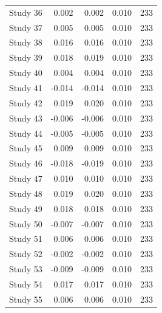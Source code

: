 \begin{table}[!h]
{\begin{tabular}[t]{rrrrr}
\hspace{1em}Study 36 & 0.002 & 0.002 & 0.010 & 233\\
\hspace{1em}Study 37 & 0.005 & 0.005 & 0.010 & 233\\
\hspace{1em}Study 38 & 0.016 & 0.016 & 0.010 & 233\\
\hspace{1em}Study 39 & 0.018 & 0.019 & 0.010 & 233\\
\hspace{1em}Study 40 & 0.004 & 0.004 & 0.010 & 233\\
\hspace{1em}Study 41 & -0.014 & -0.014 & 0.010 & 233\\
\hspace{1em}Study 42 & 0.019 & 0.020 & 0.010 & 233\\
\hspace{1em}Study 43 & -0.006 & -0.006 & 0.010 & 233\\
\hspace{1em}Study 44 & -0.005 & -0.005 & 0.010 & 233\\
\hspace{1em}Study 45 & 0.009 & 0.009 & 0.010 & 233\\
\hspace{1em}Study 46 & -0.018 & -0.019 & 0.010 & 233\\
\hspace{1em}Study 47 & 0.010 & 0.010 & 0.010 & 233\\
\hspace{1em}Study 48 & 0.019 & 0.020 & 0.010 & 233\\
\hspace{1em}Study 49 & 0.018 & 0.018 & 0.010 & 233\\
\hspace{1em}Study 50 & -0.007 & -0.007 & 0.010 & 233\\
\hspace{1em}Study 51 & 0.006 & 0.006 & 0.010 & 233\\
\hspace{1em}Study 52 & -0.002 & -0.002 & 0.010 & 233\\
\hspace{1em}Study 53 & -0.009 & -0.009 & 0.010 & 233\\
\hspace{1em}Study 54 & 0.017 & 0.017 & 0.010 & 233\\
\hspace{1em}Study 55 & 0.006 & 0.006 & 0.010 & 233\\

\end{tabular}}
\end{table}
